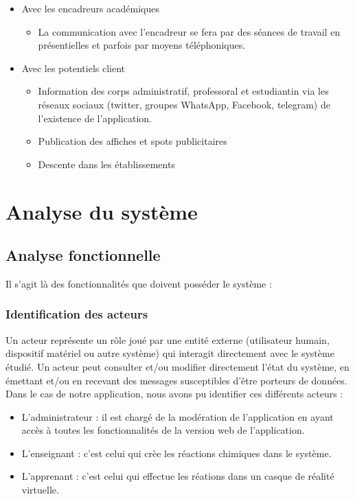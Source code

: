 \begin{itemize}
	\item Avec les encadreurs académiques
	      \begin{itemize}
		      \item La communication avec l’encadreur se fera par des séances de travail en présentielles et parfois par moyens téléphoniques.
	      \end{itemize}
	\item Avec les potentiels client
	      \begin{itemize}
		      \item Information des corps administratif, professoral et estudiantin via les réseaux sociaux (twitter, groupes WhatsApp, Facebook, telegram) de l’existence de l’application.
		      \item Publication des affiches et spots publicitaires
		      \item Descente dans les établissements
	      \end{itemize}
\end{itemize}

\section{Analyse du système}

\subsection{Analyse fonctionnelle} %
\label{sub:analyse-fonctionnelle}

Il s’agit là des fonctionnalités que doivent posséder le système :

\subsubsection{Identification des acteurs} %

Un acteur représente un rôle joué par une entité externe (utilisateur humain, dispositif matériel ou autre système) qui interagit directement avec le système étudié. Un acteur peut consulter et/ou modifier directement l’état du système, en émettant et/ou en recevant des messages susceptibles d’être porteurs de données. Dans le cas de notre application, nous avons pu identifier ces différents acteurs :

\begin{itemize}
	\item L’administrateur : il est chargé de la modération de l'application en ayant accès à toutes les fonctionnalités de la version web de l'application.
	\item L’enseignant : c'est celui qui crèe les réactions chimiques dans le système.
	\item L’apprenant : c'est celui qui effectue les réations dans un casque de réalité virtuelle.
\end{itemize}

